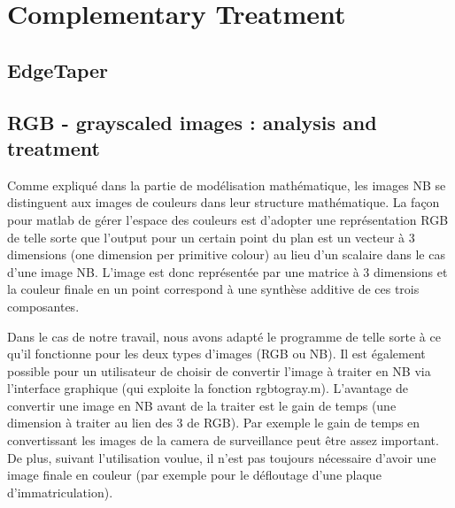 



\section{Complementary Treatment}
\subsection{EdgeTaper}

\subsection{RGB - grayscaled images : analysis and treatment}

Comme expliqué dans la partie de modélisation mathématique, les images NB se distinguent aux images de couleurs dans leur structure mathématique. La façon pour matlab de gérer l'espace des couleurs est d'adopter une représentation RGB de telle sorte que l'output pour un certain point du plan est un vecteur à 3 dimensions (one dimension per primitive colour) au lieu d'un scalaire dans le cas d'une image NB. L'image est donc représentée par une matrice à 3 dimensions et la couleur finale en un point correspond à une synthèse additive de ces trois composantes.

Dans le cas de notre travail, nous avons adapté le programme de telle sorte à ce qu'il fonctionne pour les deux types d'images (RGB ou NB). Il est également possible pour un utilisateur de choisir de convertir l'image à traiter en NB via l'interface graphique (qui exploite la fonction rgbtogray.m). L'avantage de convertir une image en NB avant de la traiter est le gain de temps (une dimension à traiter au lien des 3 de RGB). Par exemple le gain de temps en convertissant les images de la camera de surveillance peut être assez important. De plus, suivant l'utilisation voulue, il n'est pas toujours nécessaire d'avoir une image finale en couleur (par exemple pour le défloutage d'une plaque d'immatriculation). 